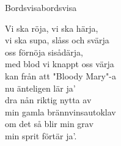 \begin{song}{Bordsvisa}{bordsvisa}
\begin{vers}
Vi ska röja, vi ska härja,\\
vi ska supa, slåss och svärja\\
oss förnöja sisådärja,\\
med blod vi knappt oss värja\\
kan från att "Bloody Mary"-a\\
nu änteligen lär ja'\\
dra nån riktig nytta av  \\
min gamla brännvinsautoklav\\
om det så blir min grav\\
min sprit förtär ja'.\\
\end{vers}
\end{song}
